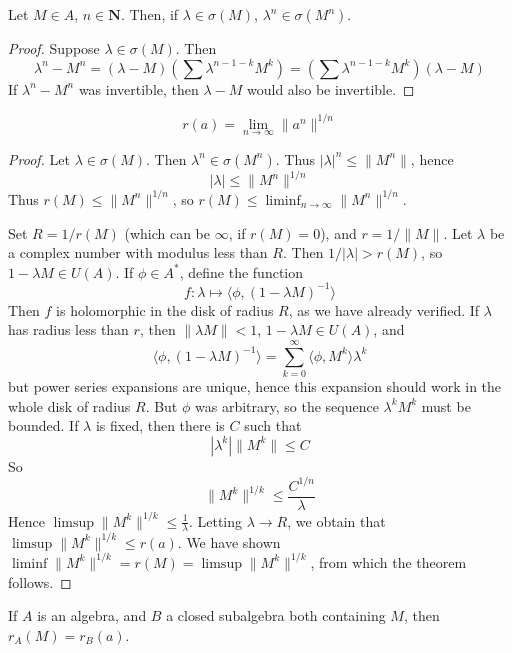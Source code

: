 \begin{lemma}
    Let $M \in A$, $n \in \mathbf{N}$. Then, if $\lambda \in \sigma(M)$, $\lambda^n \in \sigma(M^n)$.
\end{lemma}
\begin{proof}
    Suppose $\lambda \in \sigma(M)$. Then
    \[ \lambda^n - M^n = (\lambda - M) \left(\sum \lambda^{n-1-k} M^k \right) = \left(\sum \lambda^{n-1-k} M^k \right) (\lambda - M) \]
    If $\lambda^n - M^n$ was invertible, then $\lambda - M$ would also be invertible.
\end{proof}

\begin{theorem}
    \[ r(a) = \lim_{n \to \infty} \| a^n \|^{1/n} \]
\end{theorem}
\begin{proof}
    Let $\lambda \in \sigma(M)$. Then $\lambda^n \in \sigma(M^n)$. Thus $|\lambda|^n \leq \| M^n \|$, hence
    \[ |\lambda| \leq \| M^n \|^{1/n} \]
    Thus $r(M) \leq \| M^n \|^{1/n}$, so $r(M) \leq \liminf_{n \to \infty} \| M^n \|^{1/n}$.

    Set $R = 1/r(M)$ (which can be $\infty$, if $r(M) = 0$), and $r = 1/\|M\|$. Let $\lambda$ be a complex number with modulus less than $R$. Then $1/|\lambda| > r(M)$, so $1 - \lambda M \in U(A)$. If $\phi \in A^*$, define the function
    \[ f: \lambda \mapsto \langle \phi, (1 - \lambda M)^{-1} \rangle \]
    Then $f$ is holomorphic in the disk of radius $R$, as we have already verified. If $\lambda$ has radius less than $r$, then $\| \lambda M \| < 1$, $1 - \lambda M \in U(A)$, and
    \[ \langle \phi, (1 - \lambda M)^{-1} \rangle = \sum_{k = 0}^\infty \langle \phi, M^k \rangle \lambda^k \]
    but power series expansions are unique, hence this expansion should work in the whole disk of radius $R$. But $\phi$ was arbitrary, so the sequence $\lambda^k M^k$ must be bounded. If $\lambda$ is fixed, then there is $C$ such that
    \[ |\lambda^k| \|M^k\| \leq C \]
    So
    \[ \|M^k\|^{1/k} \leq \frac{C^{1/n}}{\lambda} \]
    Hence $\limsup \|M^k\|^{1/k} \leq \frac{1}{\lambda}$. Letting $\lambda \to R$, we obtain that $\limsup \|M^k\|^{1/k} \leq r(a)$. We have shown $\liminf \|M^k\|^{1/k} = r(M) = \limsup \|M^k\|^{1/k}$, from which the theorem follows.
\end{proof}

\begin{corollary}
    If $A$ is an algebra, and $B$ a closed subalgebra both containing $M$, then $r_{A}(M) = r_B(a)$.
\end{corollary}

